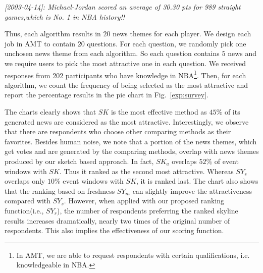 \textit{[2003-04-14]: Michael-Jordan scored an average of 30.30 pts for 989 straight games,which is No. 1 in NBA history!!}

Thus, each algorithm results in $20$ news themes for each player. We design each job in AMT to contain $20$ questions. For each question, we randomly pick one unchosen news theme from each algorithm. So each question contains $5$ news and we require users to pick the most attractive one in each question. We received responses from 202 participants who have knowledge in NBA\footnote{In AMT, we are able to request respondents with certain qualifications, i.e. knowledgeable in NBA.}. Then, for each algorithm, we count the frequency of being selected as the most attractive and report the percentage results in the pie chart in Fig.~\ref{exp:survey}.  

The charts clearly shows that $SK$ is the most effective method as $45\%$
of its generated news are considered as the most attractive. Interestingly, we observe
that there are respondents who choose other comparing methods as their favorites. Besides human noise, 
we note that a portion of the news themes, which get votes and are generated by the comparing methods, 
overlap with news themes produced by our sketch based approach. In fact, $SK_a$ overlaps $52\%$ of event 
windows with $SK$. Thus it ranked as the second most attractive. Whereas $SY_s$ overlaps only $10\%$ event windows
with $SK$, it is ranked last. The chart also shows that the ranking based on freshness $SY_m$
can slightly improve the attractiveness compared with $SY_s$. However, when applied with our proposed ranking function(i.e., $SY_r$), the number of respondents preferring the ranked skyline results increases dramatically, nearly two times of the original number of respondents. This also implies the effectiveness of our scoring function.


